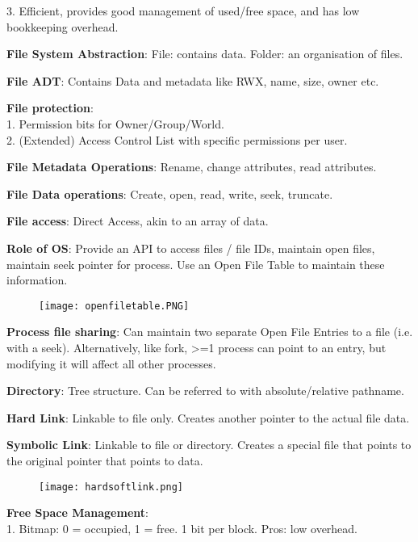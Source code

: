 \documentclass[a4paper,landscape]{article}
\newcommand{\rnname}[1]{\textbf{#1}}
\begin{document}
\begin{multicols*}{4}
\begin{flatitemize}
3. Efficient, provides good management of used/free space, and has low bookkeeping overhead.
\item \rnname{File System Abstraction}: File: contains data. Folder: an organisation of files.
\item \rnname{File ADT}: Contains Data and metadata like RWX, name, size, owner etc.
\item \rnname{File protection}:\\
1. Permission bits for Owner/Group/World.\\
2. (Extended) Access Control List with specific permissions per user.
\item \rnname{File Metadata Operations}: Rename, change attributes, read attributes.
\item \rnname{File Data operations}: Create, open, read, write, seek, truncate.
\item \rnname{File access}: Direct Access, akin to an array of data.
\item \rnname{Role of OS}: Provide an API to access files / file IDs, maintain open files, maintain seek pointer for process. Use an Open File Table to maintain these information.
\vspace{-1.5em}
\begin{figure}[H]
  \texttt{[image: openfiletable.PNG]}
\end{figure}
\vspace{-1.5em}
\item \rnname{Process file sharing}: Can maintain two separate Open File Entries to a file (i.e. with a seek). Alternatively, like fork, >=1 process can point to an entry, but modifying it will affect all other processes.
\item \rnname{Directory}: Tree structure. Can be referred to with absolute/relative pathname.
\item \rnname{Hard Link}: Linkable to file only. Creates another pointer to the actual file data.
\item \rnname{Symbolic Link}: Linkable to file or directory. Creates a special file that points to the original pointer that points to data.
\vspace{-1.5em}
\begin{figure}[H]
  \texttt{[image: hardsoftlink.png]}
\end{figure}
\vspace{-1.5em}
\item \rnname{Free Space Management}:\\
1. Bitmap: 0 = occupied, 1 = free. 1 bit per block. Pros: low overhead.\\

\end{flatitemize}
\end{multicols*}
\end{document}
